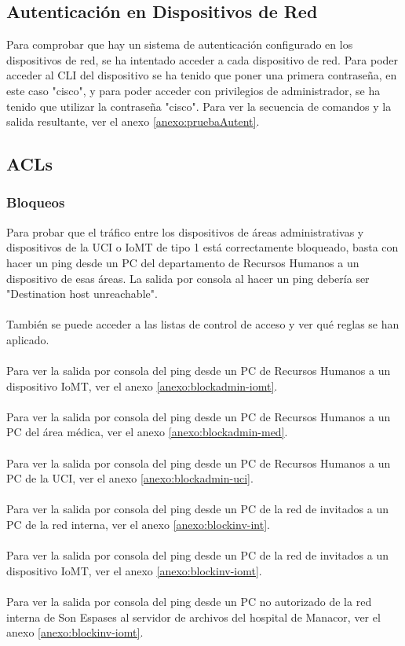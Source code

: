 \subsection{Autenticación en Dispositivos de Red}
Para comprobar que hay un sistema de autenticación configurado en los dispositivos de red, se ha intentado acceder a cada dispositivo de red. Para poder acceder al CLI del dispositivo se ha tenido que poner una primera contraseña, 
en este caso "cisco", y para poder acceder con privilegios de administrador, se ha tenido que utilizar la contraseña "cisco". Para ver la secuencia de comandos y la salida resultante, ver el anexo \ref{anexo:pruebaAutent}.

\subsection{ACLs}
\subsubsection{Bloqueos}
Para probar que el tráfico entre los dispositivos de áreas administrativas y dispositivos de la UCI o IoMT de tipo 1 está correctamente bloqueado, basta con hacer un ping desde un PC del departamento de Recursos Humanos 
a un dispositivo de esas áreas. La salida por consola al hacer un ping debería ser "Destination host unreachable".
\\ \\ 
También se puede acceder a las listas de control de acceso y ver qué reglas se han aplicado.
\\ \\ 
Para ver la salida por consola del ping desde un PC de Recursos Humanos a un dispositivo IoMT, ver el anexo \ref{anexo:blockadmin-iomt}.
\\ \\ 
Para ver la salida por consola del ping desde un PC de Recursos Humanos a un PC del área médica, ver el anexo \ref{anexo:blockadmin-med}.
\\ \\ 
Para ver la salida por consola del ping desde un PC de Recursos Humanos a un PC de la UCI, ver el anexo \ref{anexo:blockadmin-uci}.
\\ \\ 
Para ver la salida por consola del ping desde un PC de la red de invitados a un PC de la red interna, ver el anexo \ref{anexo:blockinv-int}.
\\ \\ 
Para ver la salida por consola del ping desde un PC de la red de invitados a un dispositivo IoMT, ver el anexo \ref{anexo:blockinv-iomt}.
\\ \\ 
Para ver la salida por consola del ping desde un PC no autorizado de la red interna de Son Espases al servidor de archivos del hospital de Manacor, ver el anexo \ref{anexo:blockinv-iomt}.

